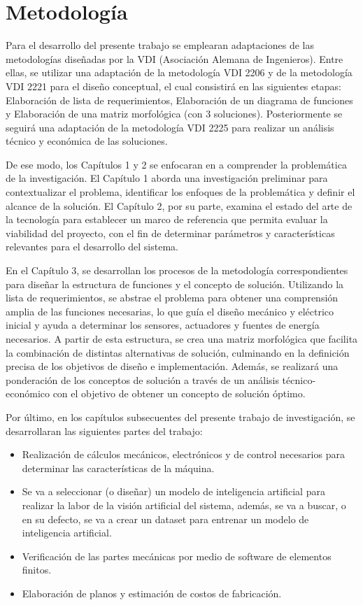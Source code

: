\section{Metodología}

Para el desarrollo del presente trabajo se emplearan adaptaciones de las metodologías diseñadas por la VDI (Asociación Alemana de Ingenieros). Entre ellas, se utilizar una adaptación de la metodología VDI 2206 \cite{VDIVDE2206_2021} y de la metodología VDI 2221 \cite{VDI2221_2019} para el diseño conceptual, el cual consistirá en las siguientes etapas: Elaboración de lista de requerimientos, Elaboración de un diagrama de funciones y Elaboración de una matriz morfológica (con 3 soluciones). Posteriormente se seguirá una adaptación de la metodología VDI 2225 \cite{VDI2225_series} para realizar un análisis técnico y económica de las soluciones.

De ese modo, los Capítulos 1 y 2 se enfocaran en a comprender la problemática de la investigación. El Capítulo 1 aborda una investigación preliminar para contextualizar el problema, identificar los enfoques de la problemática y definir el alcance de la solución. El Capítulo 2, por su parte, examina el estado del arte de la tecnología para establecer un marco de referencia que permita evaluar la viabilidad del proyecto, con el fin de determinar parámetros y características relevantes para el desarrollo del sistema.

En el Capítulo 3, se desarrollan los procesos de la metodología correspondientes para diseñar la estructura de funciones y el concepto de solución. Utilizando la lista de requerimientos, se abstrae el problema para obtener una comprensión amplia de las funciones necesarias, lo que guía el diseño mecánico y eléctrico inicial y ayuda a determinar los sensores, actuadores y fuentes de energía necesarios. A partir de esta estructura, se crea una matriz morfológica que facilita la combinación de distintas alternativas de solución, culminando en la definición precisa de los objetivos de diseño e implementación. Además, se realizará una ponderación de los conceptos de solución a través de un análisis técnico-económico con el objetivo de obtener un concepto de solución óptimo.


Por último, en los capítulos subsecuentes del presente trabajo de investigación, se desarrollaran las siguientes partes del trabajo:
\begin{itemize}
	\setlength\itemsep{-0.5em}
	\item Realización de cálculos mecánicos, electrónicos y de control necesarios para determinar las características de la máquina.
	\item Se va a seleccionar (o diseñar) un modelo de inteligencia artificial para realizar la labor de la visión artificial del sistema, además, se va a buscar, o en su defecto, se va a crear un dataset para entrenar un modelo de inteligencia artificial.
	\item Verificación de las partes mecánicas por medio de software de elementos finitos.
	\item Elaboración de planos y estimación de costos de fabricación.
\end{itemize}


